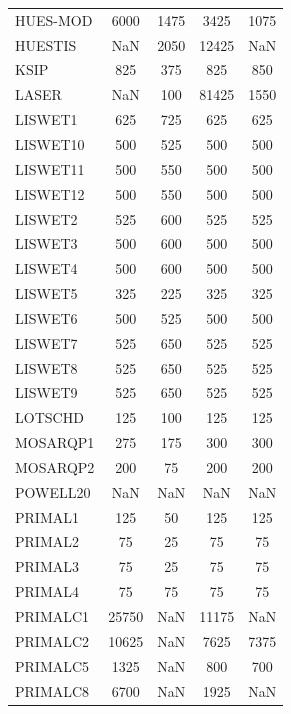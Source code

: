 \begin{longtable}{lcccc}
HUES-MOD &     6000 &  1475 &     3425 &     1075 \\
HUESTIS  &      NaN &  2050 &    12425 &      NaN \\
KSIP     &      825 &   375 &      825 &      850 \\
LASER    &      NaN &   100 &    81425 &     1550 \\
LISWET1  &      625 &   725 &      625 &      625 \\
LISWET10 &      500 &   525 &      500 &      500 \\
LISWET11 &      500 &   550 &      500 &      500 \\
LISWET12 &      500 &   550 &      500 &      500 \\
LISWET2  &      525 &   600 &      525 &      525 \\
LISWET3  &      500 &   600 &      500 &      500 \\
LISWET4  &      500 &   600 &      500 &      500 \\
LISWET5  &      325 &   225 &      325 &      325 \\
LISWET6  &      500 &   525 &      500 &      500 \\
LISWET7  &      525 &   650 &      525 &      525 \\
LISWET8  &      525 &   650 &      525 &      525 \\
LISWET9  &      525 &   650 &      525 &      525 \\
LOTSCHD  &      125 &   100 &      125 &      125 \\
MOSARQP1 &      275 &   175 &      300 &      300 \\
MOSARQP2 &      200 &    75 &      200 &      200 \\
POWELL20 &      NaN &   NaN &      NaN &      NaN \\
PRIMAL1  &      125 &    50 &      125 &      125 \\
PRIMAL2  &       75 &    25 &       75 &       75 \\
PRIMAL3  &       75 &    25 &       75 &       75 \\
PRIMAL4  &       75 &    75 &       75 &       75 \\
PRIMALC1 &    25750 &   NaN &    11175 &      NaN \\
PRIMALC2 &    10625 &   NaN &     7625 &     7375 \\
PRIMALC5 &     1325 &   NaN &      800 &      700 \\
PRIMALC8 &     6700 &   NaN &     1925 &      NaN \\

\end{longtable}
